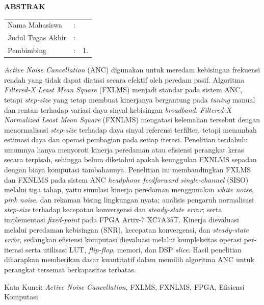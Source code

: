 \begin{center}
  \large\textbf{ABSTRAK}
\end{center}


\vspace{2ex}

\begingroup
\setlength{\tabcolsep}{0pt}

\noindent
\begin{tabularx}{\textwidth}{l >{\centering}m{2em} X}
  Nama Mahasiswa    & : & \name{}         \\

  Judul Tugas Akhir & : & \tatitle{}      \\

  Pembimbing        & : & 1. \advisor{}   \\
\end{tabularx}
\endgroup

\emph{Active Noise Cancellation} (ANC) digunakan untuk meredam kebisingan frekuensi rendah yang tidak dapat diatasi secara efektif oleh peredam pasif. Algoritma \emph{Filtered-X Least Mean Square} (FXLMS) menjadi standar pada sistem ANC, tetapi \emph{step-size} yang tetap membuat kinerjanya bergantung pada \emph{tuning} manual dan rentan terhadap variasi daya sinyal kebisingan \emph{broadband}. \emph{Filtered-X Normalized Least Mean Square} (FXNLMS) mengatasi kelemahan tersebut dengan menormalisasi \emph{step-size} terhadap daya sinyal referensi terfilter, tetapi menambah estimasi daya dan operasi pembagian pada setiap iterasi. Penelitian terdahulu umumnya hanya menyoroti kinerja peredaman atau efisiensi perangkat keras secara terpisah, sehingga belum diketahui apakah keunggulan FXNLMS sepadan dengan biaya komputasi tambahannya. Penelitian ini membandingkan FXLMS dan FXNLMS pada sistem ANC \emph{headphone feedforward single-channel} (SISO) melalui tiga tahap, yaitu simulasi kinerja peredaman menggunakan \emph{white noise}, \emph{pink noise}, dan rekaman bising lingkungan nyata; analisis pengaruh normalisasi \emph{step-size} terhadap kecepatan konvergensi dan \emph{steady-state error}; serta implementasi \emph{fixed-point} pada FPGA Artix-7 XC7A35T. Kinerja dievaluasi melalui peredaman kebisingan (SNR), kecepatan konvergensi, dan \emph{steady-state error}, sedangkan efisiensi komputasi dievaluasi melalui kompleksitas operasi per-iterasi serta utilisasi LUT, \emph{flip-flop}, memori, dan DSP \emph{slice}. Hasil penelitian diharapkan memberikan dasar kuantitatif dalam memilih algoritma ANC untuk perangkat tersemat berkapasitas terbatas.

Kata Kunci: \emph{Active Noise Cancellation}, FXLMS, FXNLMS, FPGA, Efisiensi Komputasi